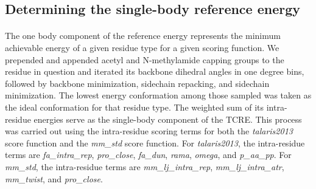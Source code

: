 \subsection{Determining the single-body reference energy}
\paragraph{}
The one body component of the reference energy represents the minimum achievable energy of a given residue type for a given scoring function.
We prepended and appended acetyl and N-methylamide capping groups to the residue in question and iterated its backbone dihedral angles in one degree bins, followed by backbone minimization, sidechain repacking, and sidechain minimization.
The lowest energy conformation among those sampled was taken as the ideal conformation for that residue type.
The weighted sum of its intra-residue energies serve as the single-body component of the TCRE.
This process was carried out using the intra-residue scoring terms for both the \textit{talaris2013} score function and the \textit{mm\_std} score function.
For \textit{talaris2013}, the intra-residue terms are \textit{fa\_intra\_rep}, \textit{pro\_close}, \textit{fa\_dun}, \textit{rama}, \textit{omega}, and \textit{p\_aa\_pp}.
For \textit{mm\_std}, the intra-residue terms are \textit{mm\_lj\_intra\_rep}, \textit{mm\_lj\_intra\_atr}, \textit{mm\_twist}, and \textit{pro\_close}.





